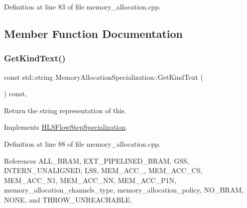 Definition at line 83 of file memory\+\_\+allocation.\+cpp.



\subsection{Member Function Documentation}
\mbox{\label{classMemoryAllocationSpecialization_a8c2ddfcb441998e471a3636503979657}} 
\subsubsection{\texorpdfstring{Get\+Kind\+Text()}{GetKindText()}}
{\footnotesize\ttfamily const std\+::string Memory\+Allocation\+Specialization\+::\+Get\+Kind\+Text (\begin{DoxyParamCaption}{ }\end{DoxyParamCaption}) const\hspace{0.3cm}{\ttfamily [override]}, {\ttfamily [virtual]}}



Return the string representation of this. 



Implements \hyperlink{classHLSFlowStepSpecialization_abcad0108fa726ac69986e26671a75ec3}{H\+L\+S\+Flow\+Step\+Specialization}.



Definition at line 88 of file memory\+\_\+allocation.\+cpp.



References A\+L\+L\+\_\+\+B\+R\+AM, E\+X\+T\+\_\+\+P\+I\+P\+E\+L\+I\+N\+E\+D\+\_\+\+B\+R\+AM, G\+SS, I\+N\+T\+E\+R\+N\+\_\+\+U\+N\+A\+L\+I\+G\+N\+ED, L\+SS, M\+E\+M\+\_\+\+A\+C\+C\+\_, M\+E\+M\+\_\+\+A\+C\+C\+\_\+\+CS, M\+E\+M\+\_\+\+A\+C\+C\+\_\+\+N1, M\+E\+M\+\_\+\+A\+C\+C\+\_\+\+NN, M\+E\+M\+\_\+\+A\+C\+C\+\_\+\+P1N, memory\+\_\+allocation\+\_\+channels\+\_\+type, memory\+\_\+allocation\+\_\+policy, N\+O\+\_\+\+B\+R\+AM, N\+O\+NE, and T\+H\+R\+O\+W\+\_\+\+U\+N\+R\+E\+A\+C\+H\+A\+B\+LE.

\mbox{\label{classMemoryAllocationSpecialization_a539bd1789baf2ecf8db545a3ea80855a}} 
